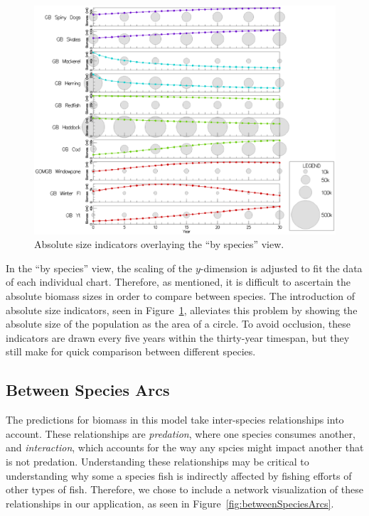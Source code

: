 \begin{figure}[h]
	\centering
	\includegraphics[width=12cm]{figures/eps/msprod_abssize.eps}
	\caption{Absolute size indicators overlaying the ``by species'' view.}
	\label{fig:msprod_abssize}
\end{figure}

In the ``by species'' view, the scaling of the $y$-dimension is adjusted to fit the data of each individual chart.  Therefore, as mentioned, it is difficult to ascertain the absolute biomass sizes in order to compare between species.  The introduction of absolute size indicators, seen in Figure~\ref{fig:msprod_abssize}, alleviates this problem by showing the absolute size of the population as the area of a circle.  To avoid occlusion, these indicators are drawn every five years within the thirty-year timespan, but they still make for quick comparison between different species.

\subsection{Between Species Arcs} 
\label{sec:betweenSpeciesArcs}

The predictions for biomass in this model take inter-species relationships into account.  These relationships are \textit{predation}, where one species consumes another, and \textit{interaction}, which accounts for the way any spcies might impact another that is not predation.  Understanding these relationships may be critical to understanding why some a species fish is indirectly affected by fishing efforts of other types of fish.  Therefore, we chose to include a network visualization of these relationships in our application, as seen in Figure~\ref{fig:betweenSpeciesArcs}.

